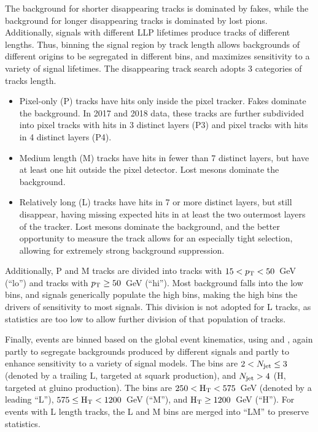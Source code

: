     The background for shorter disappearing tracks is dominated by fakes, while the background for longer disappearing tracks is dominated by lost pions.
    Additionally, signals with different LLP lifetimes produce tracks of different lengths.
    Thus, binning the signal region by track length allows backgrounds of different origins to be segregated in different bins, and maximizes sensitivity to a variety of signal lifetimes.
    The disappearing track search adopts 3 categories of tracks length.
    \begin{itemize}
      \item Pixel-only (P) tracks have hits only inside the pixel tracker. Fakes dominate the background. In 2017 and 2018 data, these tracks are further subdivided into pixel tracks with hits in 3 distinct layers (P3) and pixel tracks with hits in 4 distinct layers (P4).
      \item Medium length (M) tracks have hits in fewer than 7 distinct layers, but have at least one hit outside the pixel detector. Lost mesons dominate the background.
      \item Relatively long (L) tracks have hits in 7 or more distinct layers, but still disappear, having missing expected hits in at least the two outermost layers of the tracker. Lost mesons dominate the background, and the better opportunity to measure the track allows for an especially tight selection, allowing for extremely strong background suppression.
    \end{itemize}
    Additionally, P and M tracks are divided into tracks with $15 < p_{\mathrm{T}} < 50$~GeV (``lo'') and tracks with $p_{\mathrm{T}} \geq 50$~GeV (``hi'').
    Most background falls into the low \pt bins, and signals generically populate the high \pt bins, making the high \pt bins the drivers of sensitivity to most signals.
    This division is not adopted for L tracks, as statistics are too low to allow further division of that population of tracks.

    Finally, events are binned based on the global event kinematics, using \njet and \Ht, again partly to segregate backgrounds produced by different signals and partly to enhance sensitivity to a variety of signal models.
    The \njet bins are $2 < N_{\mathrm{jet}} \leq 3$ (denoted by a trailing L, targeted at squark production), and $N_{\mathrm{jet}} > 4$ (H, targeted at gluino production).
    The \Ht bins are $250 < \mathrm{H_{T}} < 575$~GeV (denoted by a leading ``L''), $575 \leq \mathrm{H_{T}} < 1200$~GeV (``M''), and $\mathrm{H_{T}} \geq 1200$~GeV (``H'').
    For events with L length tracks, the L and M \Ht bins are merged into ``LM'' to preserve statistics.

